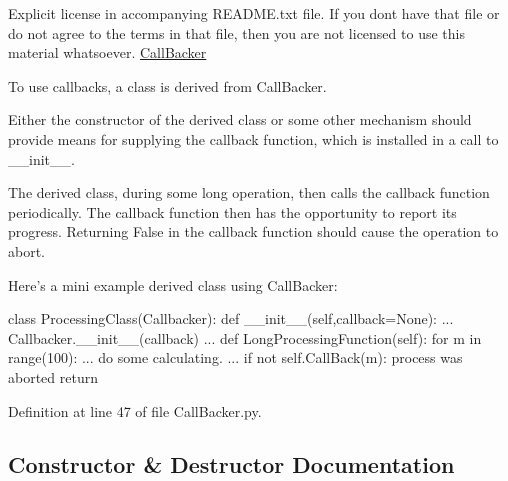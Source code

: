 Explicit license in accompanying R\+E\+A\+D\+M\+E.\+txt file. If you don\textquotesingle{}t have that file or do not agree to the terms in that file, then you are not licensed to use this material whatsoever. \hyperlink{classSignalIntegrity_1_1CallBacker_1_1CallBacker}{Call\+Backer} \begin{DoxyVerb}To use callbacks, a class is derived from CallBacker.

Either the constructor of the derived class or some other mechanism should
provide means for supplying the callback function, which is installed in a
call to __init__.

The derived class, during some long operation, then calls the callback function
periodically.  The callback function then has the opportunity to report its
progress.  Returning False in the callback function should cause the operation
to abort.

Here's a mini example derived class using CallBacker:
\end{DoxyVerb}



\begin{DoxyCode}
\textcolor{keyword}{class }ProcessingClass(Callbacker):
    \textcolor{keyword}{def }\_\_init\_\_(self,callback=None):
        ...
        Callbacker.\_\_init\_\_(callback)
        ...
    \textcolor{keyword}{def }LongProcessingFunction(self):
        \textcolor{keywordflow}{for} m \textcolor{keywordflow}{in} range(100):
            ...
            do some calculating.
            ...
            \textcolor{keywordflow}{if} \textcolor{keywordflow}{not} self.CallBack(m):
                process was aborted
                \textcolor{keywordflow}{return}
\end{DoxyCode}
 

Definition at line 47 of file Call\+Backer.\+py.



\subsection{Constructor \& Destructor Documentation}
\mbox{\label{classSignalIntegrity_1_1CallBacker_1_1CallBacker_a5580a7fcf0bfd317a8f8c7c80eefdd69}} 
